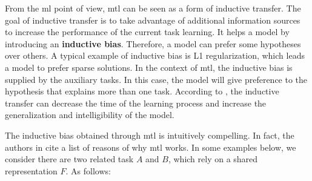 From the \acl{ml} point of view, \acl{mtl} can be seen as a form of inductive transfer. The goal of inductive transfer is to take advantage of additional information sources to increase the performance of the current task learning. It helps a model by introducing an \textbf{inductive bias}. Therefore, a model can prefer some hypotheses over others. A typical example of inductive bias is L1 regularization, which leads a model to prefer sparse solutions. In the context of \acs{mtl}, the inductive bias is supplied by the auxiliary tasks. In this case, the model will give preference to the hypothesis that explains more than one task. According to \cite{Caruana1997}, the inductive transfer can decrease the time of the learning process and increase the generalization and intelligibility of the model. 

The inductive bias obtained through \acs{mtl} is intuitively compelling. In fact, the authors in \citep{ruder2017overview} cite a list of reasons of why \acs{mtl} works. In some examples below, we consider there are two related task $A$ and $B$, which rely on a shared representation $F$. As follows:

